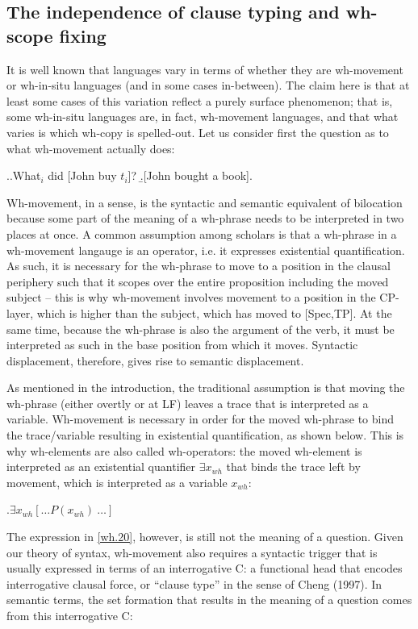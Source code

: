 \documentclass{glossa}
\begin{document}
\subsection{The independence of clause typing and wh-scope fixing}
It is well known that languages vary in terms of whether they are wh-movement or wh-in-situ languages (and in some cases in-between). The claim here is that at least some cases of this variation reflect a purely surface phenomenon; that is, some wh-in-situ languages are, in fact, wh-movement languages, and that what varies is which wh-copy is spelled-out. Let us consider first the question as to what wh-movement actually does:

\ex.\label{wh.10}\a.\label{2.10a}What$_i$ did [John buy $t_i$]?
	\b.\label{2.10b}[John bought a book].

Wh-movement, in a sense, is the syntactic and semantic equivalent of bilocation because some part of the meaning of a wh-phrase needs to be interpreted in two places at once. A common assumption among scholars is that a wh-phrase in a wh-movement langauge is an operator, i.e. it expresses existential quantification. As such, it is necessary for the wh-phrase to move to a position in the clausal periphery such that it scopes over the entire proposition including the moved subject -- this is why wh-movement involves movement to a position in the CP-layer, which is higher than the subject, which has moved to [Spec,TP]. At the same time, because the wh-phrase is also the argument of the verb, it must be interpreted as such in the base position from which it moves. Syntactic displacement, therefore, gives rise to semantic displacement.

As mentioned in the introduction, the traditional assumption is that moving the wh-phrase (either overtly or at LF) leaves a trace that is interpreted as a variable. Wh-movement is necessary in order for the moved wh-phrase to bind the trace/variable resulting in existential quantification, as shown below. This is why wh-elements are also called wh-operators: the moved wh-element is interpreted as an existential quantifier $\exists x_{wh}$ that binds the trace left by movement, which is interpreted as a variable $x_{wh}$:

\ex.\label{wh.20}$\exists x_{wh}[\dots P(x_{wh})\ \dots]$

The expression in \ref{wh.20}, however, is still not the meaning of a question. Given our theory of syntax, wh-movement also requires a syntactic trigger that is usually expressed in terms of an interrogative C: a functional head that encodes interrogative clausal force, or ``clause type'' in the sense of Cheng (1997). In semantic terms, the set formation that results in the meaning of a question comes from this interrogative C:
\end{document}

